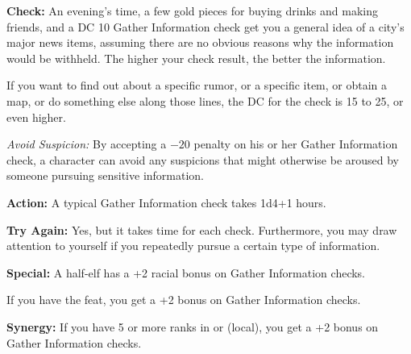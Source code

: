 \textbf{Check:} An evening's time, a few gold pieces for buying drinks and making friends, and a DC 10 Gather Information check get you a general idea of a city's major news items, assuming there are no obvious reasons why the information would be withheld. The higher your check result, the better the information.

If you want to find out about a specific rumor, or a specific item, or obtain a map, or do something else along those lines, the DC for the check is 15 to 25, or even higher.

\textit{Avoid Suspicion:} By accepting a $-20$ penalty on his or her Gather Information check, a character can avoid any suspicions that might otherwise be aroused by someone pursuing sensitive information.

\textbf{Action:} A typical Gather Information check takes 1d4+1 hours.

\textbf{Try Again:} Yes, but it takes time for each check. Furthermore, you may draw attention to yourself if you repeatedly pursue a certain type of information.

\textbf{Special:} A half-elf has a +2 racial bonus on Gather Information checks.

If you have the  feat, you get a +2 bonus on Gather Information checks.

\textbf{Synergy:} If you have 5 or more ranks in  or  (local), you get a +2 bonus on Gather Information checks.